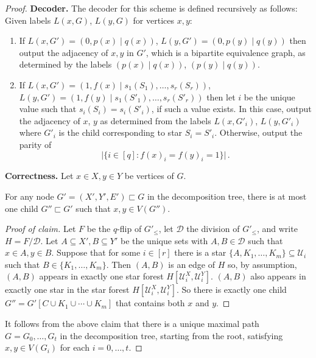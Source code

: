 \documentclass{article}
\newcommand\eqLabelSep{\mathbin|}
\newcommand{\cD}{\ensuremath{\mathcal{D}}}
\newcommand{\cU}{\ensuremath{\mathcal{U}}}
\begin{document}
\begin{proof}
\noindent\textbf{Decoder.}
The decoder for this scheme is defined recursively as follows: Given labels $L(x,G)$, $L(y,G)$ for
vertices $x,y$:
\begin{enumerate}[itemsep=0pt,topsep=4pt,partopsep=0pt]
\item If $L(x,G') = (0, p(x) \eqLabelSep q(x))$, $L(y,G') = (0, p(y) \eqLabelSep q(y))$ then output the adjacency of
$x,y$ in $G'$, which is a bipartite equivalence graph, as determined by the labels $(p(x) \eqLabelSep q(x))$, $(p(y) \eqLabelSep q(y))$.
\item If $L(x,G') = (1, f(x) \eqLabelSep s_1(S_1), \dotsc, s_r(S_r))$, $L(y,G') = (1, f(y) \eqLabelSep s_1(S'_1),
\dotsc, s_r(S'_r))$ then let $i$ be the unique value such that $s_i(S_i)=s_i(S'_i)$, if such a
value exists. In this case, output the adjacency of $x$, $y$ as determined from the labels $L(x,G'_i)$,
$L(y,G'_i)$ where $G'_i$ is the child corresponding to star $S_i = S'_i$.
Otherwise, output the parity of
\[
\bigl|\bigl\{i \in [q] : f(x)_i = f(y)_i = 1 \bigr\}\bigr| \,.
\]
\label{step:flip}
\end{enumerate}

\noindent\textbf{Correctness.}
Let $x \in X, y \in Y$ be vertices of $G$.
\begin{claim}
For any node $G' = (X',Y',E') \sqsubset G$
in the decomposition tree, there is at most one child $G'' \sqsubset G'$ such that $x,y \in V(G'')$.
\end{claim}
\begin{proof}[Proof of claim]
Let $F$ be the $q$-flip of $G'_\leq$, let $\cD$ the division of $G'_\leq$, and write $H = F/\cD$.
Let $A \subseteq X', B \subseteq Y'$ be the unique sets with $A,B \in \cD$ such that $x \in A, y \in
B$. Suppose that for some $i \in [r]$ there is a star $\{A, K_1, \dotsc, K_m\} \subseteq \cU_i$
such that $B \in \{K_1, \dotsc, K_m\}$. Then $(A,B)$ is an edge of $H$ so, by assumption, $(A,B)$
appears in exactly one star forest $H[\cU^X_i,\cU^Y_i]$. $(A,B)$ also appears in exactly one star in
the star forest $H[\cU^X_i,\cU^Y_i]$. So there is exactly one child $G'' = G'[C \cup K_1 \cup \dotsm
\cup K_m]$ that contains both $x$ and $y$.
\end{proof}
It follows from the above claim that there is a unique maximal path $G = G_0, \dotsc, G_t$ in the
decomposition tree, starting from the root, satisfying $x,y \in V(G_i)$ for each $i = 0, \dotsc, t$.


\end{proof}
\end{document}
